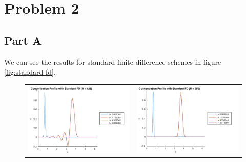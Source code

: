 \documentclass{article}
\begin{document}
\section{Problem 2}
\subsection{Part A}
We can see the results for standard finite difference schemes in figure \ref{fig:standard-fd}.

\begin{figure}[!ht]
\centering
\begin{tabular}{c c}
\includegraphics[scale=0.5]{p2a_128.pdf} & \includegraphics[scale=0.5]{p2a_256.pdf} \\

\end{tabular}
\end{figure}
\end{document}
